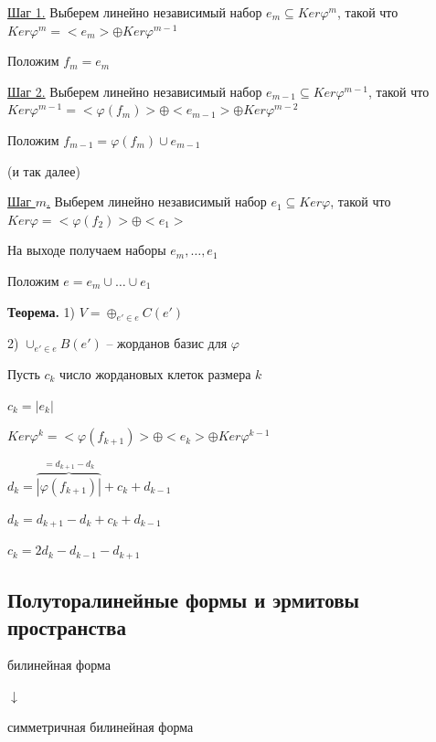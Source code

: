 \vspace{\baselineskip}
\underline{Шаг 1.} Выберем линейно независимый набор $e_m \subseteq Ker \varphi^m$, такой что $Ker \varphi^m = <e_m> \oplus Ker \varphi^{m-1}$

Положим $f_m = e_m$

\vspace{\baselineskip}
\underline{Шаг 2.} Выберем линейно независимый набор $e_{m - 1} \subseteq Ker \varphi^{m-1}$, такой что $Ker \varphi^{m-1} = <\varphi(f_m)> \oplus <e_{m-1}> \oplus Ker \varphi^{m-2}$

Положим $f_{m-1} = \varphi(f_m) \cup e_{m-1}$

\vspace{\baselineskip}
(и так далее)

\vspace{\baselineskip}
\underline{Шаг $m$.} Выберем линейно независимый набор $e_1 \subseteq Ker \varphi$, такой что $Ker \varphi = <\varphi(f_2)> \oplus <e_1>$

\vspace{\baselineskip}
На выходе получаем наборы $e_m, \dots, e_1$

Положим $e = e_m \cup \dots \cup e_1$

\vspace{\baselineskip}
\textbf{Теорема.} 1) $V = \oplus_{e' \in e} C(e')$

2) $\cup_{e' \in e} B(e')$ -- жорданов базис для $\varphi$

\vspace{\baselineskip}
Пусть $c_k$ число жордановых клеток размера $k$

$c_k = |e_k|$

$Ker \varphi^k = <\varphi(f_{k+1})> \oplus <e_k> \oplus Ker \varphi^{k-1}$

$d_k = \overbrace{|\varphi(f_{k+1})|}^{= d_{k+1} - d_k} + c_k + d_{k-1}$

$d_k = d_{k+1} - d_k + c_k + d_{k - 1}$

$c_k = 2d_k - d_{k-1} - d_{k+1}$

\subsection{Полуторалинейные формы и эрмитовы пространства}

\vspace{\baselineskip}
билинейная форма

$\downarrow$

симметричная билинейная форма

